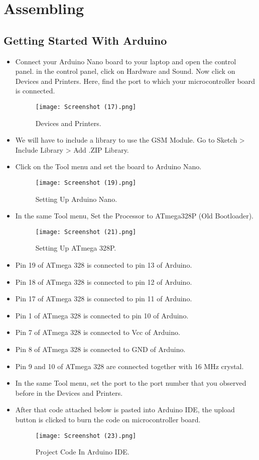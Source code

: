 \chapter{Assembling}



\section{Getting Started With Arduino}
\begin{itemize}
	\item Connect your Arduino Nano board to your laptop and open the control panel. in the control panel, click on Hardware and Sound. Now click on Devices and Printers. Here, find the port to which your microcontroller board is connected.
	\begin{figure}[h]
		\centering
		\texttt{[image: Screenshot (17).png]}
		\caption{Devices and Printers.}
	\end{figure}
	\item We will have to include a library to use the GSM Module. Go to Sketch > Include Library > Add .ZIP Library.
	\item Click on the Tool menu and set the board to Arduino Nano.
	\begin{figure}[h]
		\centering
		\texttt{[image: Screenshot (19).png]}
		\caption{Setting Up Arduino Nano.}
	\end{figure}
	\pagebreak\item In the same Tool menu, Set the Processor to ATmega328P (Old Bootloader).
	\begin{figure}[h]
		\centering
		\texttt{[image: Screenshot (21).png]}
		\caption{Setting Up ATmega 328P.}
	\end{figure}
	\item Pin 19 of ATmega 328 is connected to pin 13 of Arduino.
	\item Pin 18 of ATmega 328 is connected to pin 12 of Arduino.
	\item Pin 17 of ATmega 328 is connected to pin 11 of Arduino.
	\item Pin 1 of ATmega 328 is connected to pin 10 of Arduino.
	\item Pin 7 of ATmega 328 is connected to Vcc of Arduino.
	\item Pin 8 of ATmega 328 is connected to GND of Arduino.
	\item Pin 9 and 10 of ATmega 328 are connected together with 16 MHz crystal.
	\item In the same Tool menu, set the port to the port number that you observed before in the Devices and Printers.
	\item After that code attached below is pasted into Arduino IDE, the upload button is clicked to burn the code on  microcontroller board.
	
	\begin{figure}[h]
		\centering
		\texttt{[image: Screenshot (23).png]}
		\caption{Project Code In Arduino IDE.}
	\end{figure}
	
	
	
	\pagebreak
\end{itemize}


